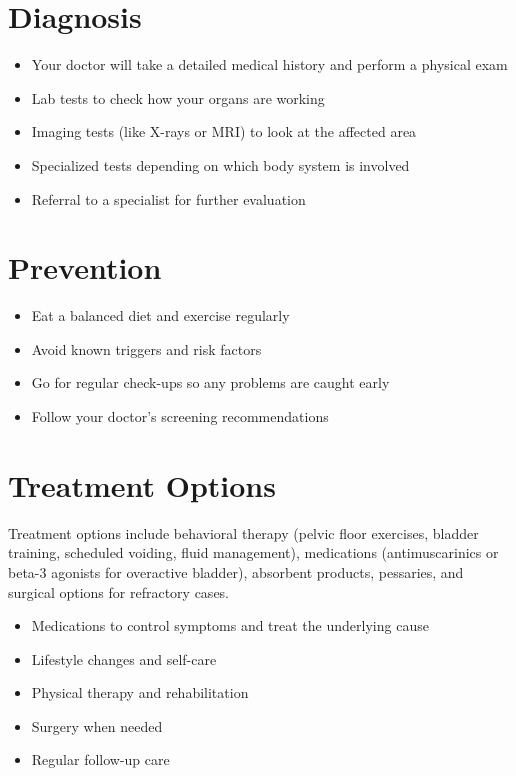 \section{Diagnosis}

\begin{itemize}[noitemsep]
  \item Your doctor will take a detailed medical history and perform a physical exam
  \item Lab tests to check how your organs are working
  \item Imaging tests (like X-rays or MRI) to look at the affected area
  \item Specialized tests depending on which body system is involved
  \item Referral to a specialist for further evaluation
\end{itemize}

\section{Prevention}

\begin{itemize}[noitemsep]
  \item Eat a balanced diet and exercise regularly
  \item Avoid known triggers and risk factors
  \item Go for regular check-ups so any problems are caught early
  \item Follow your doctor's screening recommendations
\end{itemize}

\section{Treatment Options}
Treatment options include behavioral therapy (pelvic floor exercises, bladder training, scheduled voiding, fluid management), medications (antimuscarinics or beta-3 agonists for overactive bladder), absorbent products, pessaries, and surgical options for refractory cases.

\begin{itemize}[noitemsep]
  \item Medications to control symptoms and treat the underlying cause
  \item Lifestyle changes and self-care
  \item Physical therapy and rehabilitation
  \item Surgery when needed
  \item Regular follow-up care
\end{itemize}

